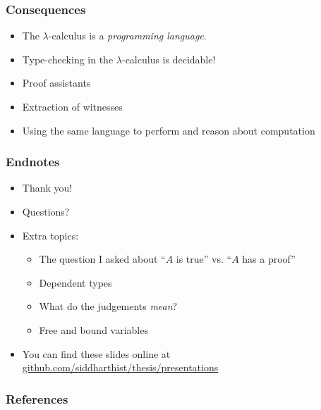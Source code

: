 \documentclass{beamer}
\begin{document}
\begin{frame}
  \frametitle{Consequences}

  \begin{itemize}
    \itemsep0em
    \item The $\lambda$-calculus is a \textit{programming language}. 
    \item Type-checking in the $\lambda$-calculus is decidable!
    \item Proof assistants
    \item Extraction of witnesses
    \item Using the same language to perform and reason about computation
  \end{itemize}

\end{frame}

\begin{frame}
  \frametitle{Endnotes}
  \begin{itemize}
    \item Thank you!
    \item Questions?
    \item Extra topics:
      \begin{itemize}
        \item The question I asked about ``$A$ is true'' vs. ``$A$ has a proof''
        \item Dependent types
        \item What do the judgements \textit{mean}?
        \item Free and bound variables
      \end{itemize}
    \item You can find these slides online at
      \url{github.com/siddharthist/thesis/presentations}
  \end{itemize}
\end{frame}

\begin{frame}[allowframebreaks]
  \frametitle{References}

  \printbibliography
\end{frame}

\end{document}
